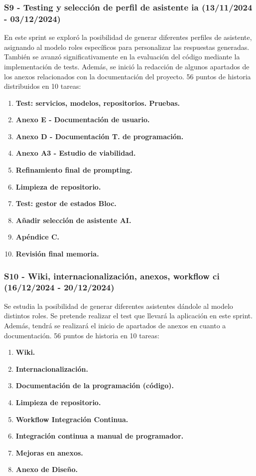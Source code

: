 \subsubsection{S9 - Testing y selección de perfil de asistente \acrshort{ia} (13/11/2024 - 03/12/2024)}
En este sprint se exploró la posibilidad de generar diferentes perfiles de asistente, asignando al modelo roles específicos para personalizar las respuestas generadas. También se avanzó significativamente en la evaluación del código mediante la implementación de tests. Además, se inició la redacción de algunos apartados de los anexos relacionados con la documentación del proyecto. 56 puntos de historia distribuidos en 10 tareas:
\begin{enumerate}
	\item \textbf{Test: servicios, modelos, repositorios. Pruebas.}
	\item \textbf{Anexo E - Documentación de usuario.}
	\item \textbf{Anexo D - Documentación T. de programación.}
	\item \textbf{Anexo A3 - Estudio de viabilidad.}
	\item \textbf{Refinamiento final de prompting.}
	\item \textbf{Limpieza de repositorio.}
	\item \textbf{Test: gestor de estados Bloc.}
	\item \textbf{Añadir selección de asistente AI.}
	\item \textbf{Apéndice C.}
	\item \textbf{Revisión final memoria.}
\end{enumerate}

\subsubsection{S10 - Wiki, internacionalización, anexos, workflow ci (16/12/2024 - 20/12/2024)}
Se estudia la posibilidad de generar diferentes asistentes dándole al modelo distintos roles. Se pretende realizar el test que llevará la aplicación en este sprint. Además, tendrá se realizará el inicio de apartados de anexos en cuanto a documentación. 56 puntos de historia en 10 tareas:
\begin{enumerate}
	\item \textbf{Wiki.}
	\item \textbf{Internacionalización.}
	\item \textbf{Documentación de la programación (código).}
	\item \textbf{Limpieza de repositorio.}
	\item \textbf{Workflow Integración Continua.}
	\item \textbf{Integración continua a manual de programador.}
	\item \textbf{Mejoras en anexos.}
	\item \textbf{Anexo de Diseño.}
\end{enumerate}

